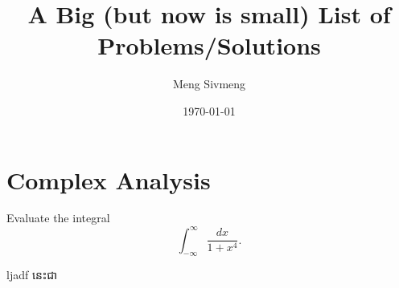 


\title{A Big (but now is small) List of Problems/Solutions}
\author{Meng Sivmeng}
\date{\today}



\maketitle
\chapter{Complex Analysis}

\begin{problem}
	Evaluate the integral
  \[\int_{-\infty}^{\infty}\frac{dx}{1+x^4}.\]
\end{problem}
\begin{solution}
	ljadf នេះជា
\end{solution}







